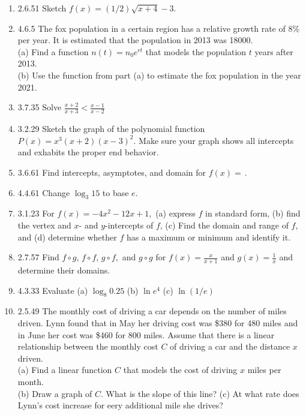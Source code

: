 \documentclass[11pt]{article}
\begin{document}
\begin{enumerate}
\item 2.6.51 Sketch $f(x)=(1/2)\sqrt{x+4}-3.$
\item 4.6.5 The fox population in a certain region has a relative growth rate of $8\%$ per year. It is estimated that the population in 2013 was 18000. \\
(a) Find a function $n(t)=n_0e^{rt}$ that models the population $t$ years after 2013.\\
(b) Use the function from part (a) to estimate the fox population in the year 2021.\\
\item 3.7.35 Solve $\frac{x+2}{x+3} < \frac{x-1}{x-2}$

\item 3.2.29 Sketch the graph of the polynomial function $P(x)=x^3(x+2)(x-3)^2 $. Make sure your graph shows all intercepts and exhabits the proper end behavior.

\item 3.6.61 Find intercepts, asymptotes, and domain for $f(x)=\frac{}{}.$

\item 4.4.61 Change $\log_3 15$ to base $e.$

\item 3.1.23 For $f(x)=-4x^2-12x+1,$ (a) express $f$ in standard form, (b) find the vertex and $x$- and $y$-intercepts of $f$, (c) Find the domain and range of $f$, and (d) determine whether $f$ has a maximum or minimum and identify it.

\item 2.7.57 Find $f \circ g$, $f \circ f$, $g\circ f,$ and $g \circ g$ for $f(x)=\frac{x}{x+1}$ and $g(x)=\frac{1}{x}$ and determine their domains.

\item 4.3.33 Evaluate (a) $\log_8 0.25 $ (b) $\ln e^4 $ (c) $\ln (1/e) $

\item 2.5.49 The monthly cost of driving a car depends on the number of miles driven. Lynn found that in May her driving cost was \$380 for 480 miles and in June her cost was \$460 for 800 miles. Assume that there is a linear relationship between the monthly cost $C$ of driving a car and the distance $x$ driven.\\
(a) Find a linear function $C$ that models the cost of driving $x$ miles per month.\\
(b) Draw a graph of $C.$ What is the slope of this line?
(c) At what rate does Lynn's cost increase for eery additional mile she drives?\\


\end{enumerate}
\end{document}
